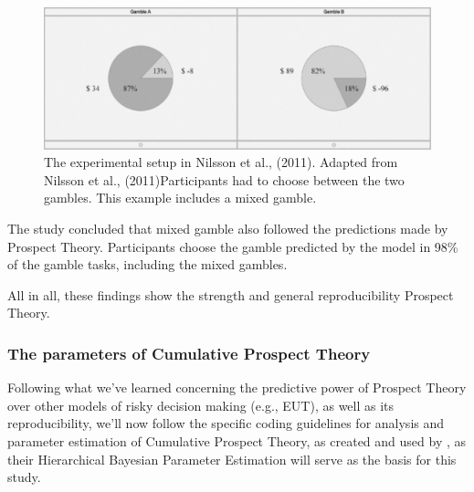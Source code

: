\documentclass{article}
\begin{document}
\begin{figure}[H]
    \begin{centering}
    \includegraphics[width = \textwidth]{figures/Billede 1.png}
    \caption{The experimental setup in Nilsson et al., (2011). Adapted from Nilsson et al., (2011)Participants had to choose between the two gambles. This example includes a mixed gamble.}
    \end{centering}
\end{figure}

The study concluded that mixed gamble also followed the predictions made by Prospect Theory. Participants choose the gamble predicted by the model in 98\% of the gamble tasks, including the mixed gambles.

All in all, these findings show the strength and general reproducibility Prospect Theory. 


    \subsubsection{The parameters of Cumulative Prospect Theory}
    Following what we’ve learned concerning the predictive power of Prospect Theory over other models of risky decision making (e.g., EUT), as well as its reproducibility, we’ll now follow the specific coding guidelines for analysis and parameter estimation of Cumulative Prospect Theory, as created and used by , as their Hierarchical Bayesian Parameter Estimation will serve as the basis for this study.
\end{document}
